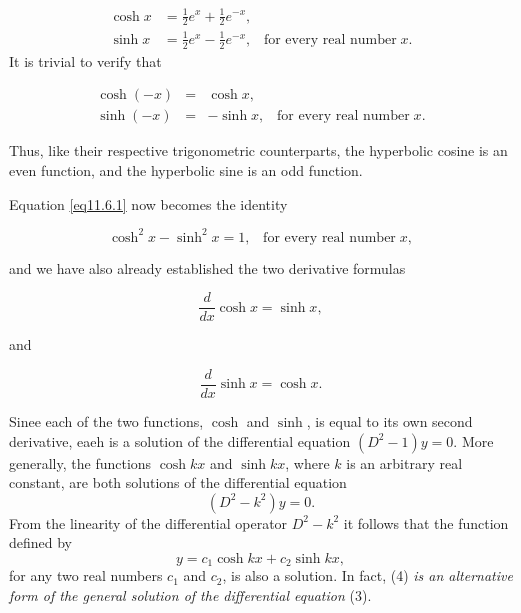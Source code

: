 \begin{equation}
       \begin{array}{ll}
              \cosh x & = \frac{1}{2}e^x + \frac{1}{2}e^{-x},                                         \\
              \sinh x & = \frac{1}{2}e^x - \frac{1}{2}e^{-x}, \;\;\;\mbox{for every real number}\; x.
              \label{eq11.6.2}
       \end{array}
\end{equation}
It is trivial to verify that

\begin{theorem}
       \begin{eqnarray*}
              \cosh(-x) &=& \cosh x, \\
              \sinh(-x) &=& -\sinh x,\;\;\;\mbox{for every real number}\; x.
       \end{eqnarray*}
\end{theorem}
\noindent Thus, like their respective trigonometric counterparts, the hyperbolic cosine is an even function, and the hyperbolic sine is an odd function.

Equation \ref{eq11.6.1} now becomes the identity
\begin{theorem}
       $$
              \cosh^2 x - \sinh^2 x = 1, \;\;\;\mbox{for every real number}\; x,
       $$
\end{theorem}
\noindent and we have also already established the two derivative formulas
\begin{theorem}
       $$
              \frac{d}{dx} \cosh x = \sinh x,
       $$
\end{theorem}
\noindent and
\begin{theorem}
       $$
              \frac{d}{dx} \sinh x = \cosh x.
       $$
\end{theorem}

Sinee each of the two functions, $\cosh$ and $\sinh$, is equal to its own second derivative, eaeh is a solution of the differential equation $(D^2 - 1)y = 0$. More generally, the functions $\cosh kx$ and $\sinh kx$, where $k$ is an arbitrary real constant, are both solutions of the differential equation
\begin{equation}
       (D^2 - k^2) y = 0.
       \label{eq11.6.3}
\end{equation}
From the linearity of the differential operator $D^2 - k^2$ it follows that the function defined by
\begin{equation}
       y = c_1 \cosh kx + c_2 \sinh kx,
       \label{eq11.6.4}
\end{equation}
for any two real numbers $c_1$ and $c_2$, is also a solution. In fact, (4) \textit{is an alternative form of the general solution of the differential equation} (3).

